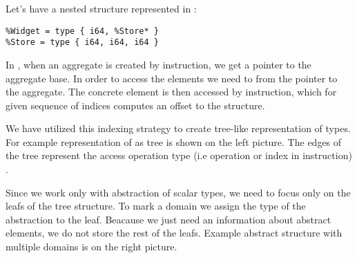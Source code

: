 \begin{example} \label{ex:fieldtrie}
Let's have a nested structure represented in \LLVMIR:
\begin{verbatim}
%Widget = type { i64, %Store* }
%Store = type { i64, i64, i64 }
\end{verbatim}
In \LLVM, when an aggregate is created by  instruction, we get
a pointer to the aggregate base. In order to access the elements we need to
 from the pointer to the aggregate. The concrete element is then
accessed by  instruction, which for given sequence of
indices computes an offset to the structure.

We have utilized this indexing strategy to create tree-like representation
of types. For example representation of  as tree is shown on the
left picture. The edges of the tree represent the access operation type
(i.e  operation or index in  instruction)
\cite{LLVM:langref}.

Since we work only with abstraction of scalar types, we need to focus only on
the leafs of the tree structure. To mark a domain we assign the type of the
abstraction to the leaf. Beacause we just need an information about abstract
elements, we do not store the rest of the leafs. Example abstract structure
with multiple domains is on the right picture.


\end{example}
